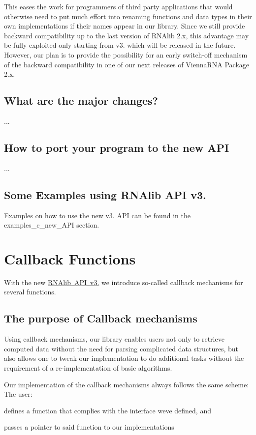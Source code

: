 This eases the work for programmers of third party applications that would otherwise need to put much effort into renaming functions and data types in their own implementations if their names appear in our library. Since we still provide backward compatibility up to the last version of R\+N\+Alib 2.\+x, this advantage may be fully exploited only starting from v3. which will be released in the future. However, our plan is to provide the possibility for an early switch-\/off mechanism of the backward compatibility in one of our next releases of Vienna\+R\+NA Package 2.\+x.\hypertarget{newAPI_newAPI_changes}{}\subsection{What are the major changes?}\label{newAPI_newAPI_changes}
...\hypertarget{newAPI_newAPI_porting}{}\subsection{How to port your program to the new A\+PI}\label{newAPI_newAPI_porting}
...\hypertarget{newAPI_newAPI_examples}{}\subsection{Some Examples using R\+N\+Alib A\+P\+I v3.}\label{newAPI_newAPI_examples}
Examples on how to use the new v3. A\+PI can be found in the examples\+\_\+c\+\_\+new\+\_\+\+A\+PI section. \hypertarget{callbacks}{}\section{Callback Functions}\label{callbacks}
With the new \mbox{\hyperlink{newAPI}{R\+N\+Alib A\+PI v3.}} we introduce so-\/called callback mechanisms for several functions.\hypertarget{callbacks_callbacks_intro}{}\subsection{The purpose of Callback mechanisms}\label{callbacks_callbacks_intro}
Using callback mechanisms, our library enables users not only to retrieve computed data without the need for parsing complicated data structures, but also allows one to tweak our implementation to do additional tasks without the requirement of a re-\/implementation of basic algorithms.

Our implementation of the callback mechanisms always follows the same scheme\+: The user\+:
\begin{DoxyItemize}
\item defines a function that complies with the interface we\textquotesingle{}ve defined, and
\item passes a pointer to said function to our implementations
\end{DoxyItemize}

